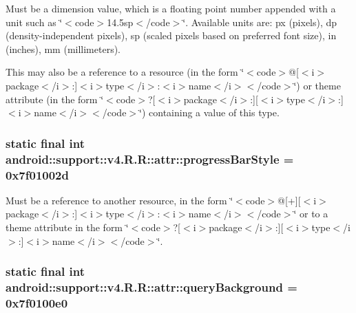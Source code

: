 Must be a dimension value, which is a floating point number appended with a unit such as \char`\"{}$<$code$>$14.5sp$<$/code$>$\char`\"{}. Available units are: px (pixels), dp (density-independent pixels), sp (scaled pixels based on preferred font size), in (inches), mm (millimeters). 

This may also be a reference to a resource (in the form \char`\"{}$<$code$>$@\mbox{[}$<$i$>$package$<$/i$>$:\mbox{]}$<$i$>$type$<$/i$>$:$<$i$>$name$<$/i$>$$<$/code$>$\char`\"{}) or theme attribute (in the form \char`\"{}$<$code$>$?\mbox{[}$<$i$>$package$<$/i$>$:\mbox{]}\mbox{[}$<$i$>$type$<$/i$>$:\mbox{]}$<$i$>$name$<$/i$>$$<$/code$>$\char`\"{}) containing a value of this type. \hypertarget{classandroid_1_1support_1_1v4_1_1_r_1_1attr_dd9c71af0c85a3754d3f2f883d91f5fd}{
\subsubsection[{progressBarStyle}]{\setlength{\rightskip}{0pt plus 5cm}static final int android::support::v4.R.R::attr::progressBarStyle = 0x7f01002d}}
\label{classandroid_1_1support_1_1v4_1_1_r_1_1attr_dd9c71af0c85a3754d3f2f883d91f5fd}


Must be a reference to another resource, in the form \char`\"{}$<$code$>$@\mbox{[}+\mbox{]}\mbox{[}$<$i$>$package$<$/i$>$:\mbox{]}$<$i$>$type$<$/i$>$:$<$i$>$name$<$/i$>$$<$/code$>$\char`\"{} or to a theme attribute in the form \char`\"{}$<$code$>$?\mbox{[}$<$i$>$package$<$/i$>$:\mbox{]}\mbox{[}$<$i$>$type$<$/i$>$:\mbox{]}$<$i$>$name$<$/i$>$$<$/code$>$\char`\"{}. \hypertarget{classandroid_1_1support_1_1v4_1_1_r_1_1attr_c8b580097ef1e35ee6a35e844b838af2}{
\subsubsection[{queryBackground}]{\setlength{\rightskip}{0pt plus 5cm}static final int android::support::v4.R.R::attr::queryBackground = 0x7f0100e0}}
\label{classandroid_1_1support_1_1v4_1_1_r_1_1attr_c8b580097ef1e35ee6a35e844b838af2}


